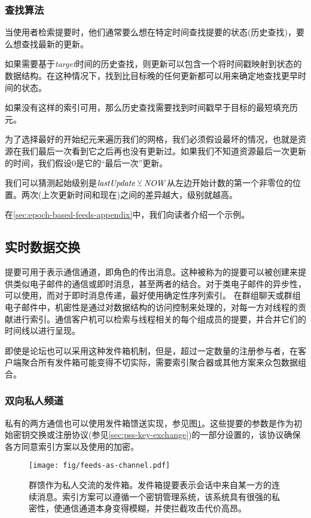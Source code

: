 \subsubsection{查找算法}

当使用者检索提要时，他们通常要么想在特定时间查找提要的状态(历史查找)，要么想查找最新的更新。

如果需要基于\emph{target}时间的历史查找，则更新可以包含一个将时间戳映射到状态的数据结构。在这种情况下，找到比目标晚的任何更新都可以用来确定地查找更早时间的状态。 

如果没有这样的索引可用，那么历史查找需要找到时间戳早于目标的最短填充历元。

为了选择最好的开始纪元来遍历我们的网格，我们必须假设最坏的情况，也就是资源在我们最后一次看到它之后再也没有更新过。如果我们不知道资源最后一次更新的时间，我们假设0是它的“最后一次”更新。

我们可以猜测起始级别是$\mathit{lastUpdate}\veebar \mathit{NOW}$从左边开始计数的第一个非零位的位置。两次(上次更新时间和现在)之间的差异越大，级别就越高。

在\ref{sec:epoch-based-feeds-appendix}中，我们向读者介绍一个示例。

\subsection{实时数据交换}\label{sec:feed-as-channel}

提要可用于表示通信通道，即角色的传出消息。这种被称为的提要可以被创建来提供类似电子邮件的通信或即时消息，甚至两者的结合。对于类电子邮件的异步性，可以使用，而对于即时消息传递，最好使用确定性序列索引。
在群组聊天或群组电子邮件中，机密性是通过对数据结构的访问控制来处理的，对每一方对线程的贡献进行索引。通信客户机可以检索与线程相关的每个组成员的提要，并合并它们的时间线以进行呈现。

即使是论坛也可以采用这种发件箱机制，但是，超过一定数量的注册参与者，在客户端聚合所有发件箱可能变得不切实际，需要索引聚合器或其他方案来众包数据组合。

\subsubsection{双向私人频道}
 
私有的两方通信也可以使用发件箱馈送实现，参见图\ref{fig:feeds-as-channel}。这些提要的参数是作为初始密钥交换或注册协议(参见\ref{sec:pss-key-exchange})的一部分设置的，该协议确保各方同意索引方案以及使用的加密。 


\begin{figure}[htbp]
  \centering
  \texttt{[image: fig/feeds-as-channel.pdf]}  
  \caption[Swarm feed作为outboxes \statusgreen]{群馈作为私人交流的发件箱。发件箱提要表示会话中来自某一方的连续消息。索引方案可以遵循一个密钥管理系统，该系统具有很强的私密性，使通信通道本身变得模糊，并使拦截攻击代价高昂。}
\label{fig:feeds-as-channel}
\end{figure}


